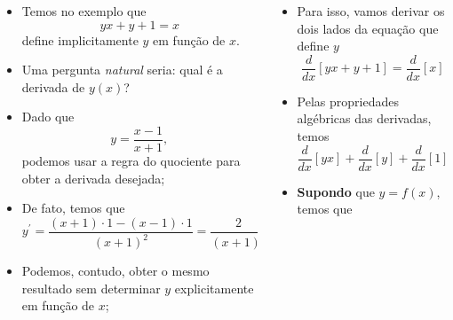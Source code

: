 \begin{frame}
  \begin{columns}[onlytextwidth]
    \begin{column}{0.49\textwidth}\vspace*{-0.5cm}
      \begin{itemize}
        \item Temos no exemplo que
        \begin{equation*}
          yx + y + 1 = x
        \end{equation*}
        define implicitamente $y$ em função de $x$.
        \item Uma pergunta \emph{natural} seria: qual é a derivada de $y(x)$?
        \item Dado que
        \begin{equation*}
          y = \frac{x-1}{x+1},
        \end{equation*}
        podemos usar a regra do quociente para obter a derivada desejada;
        \item De fato, temos que
        \begin{equation*}
          y^{\prime} = \frac{(x+1)\cdot 1 - (x-1)\cdot 1}{(x+1)^{2}} = \frac{2}{(x+1)^{2}}
        \end{equation*}
        \item Podemos, contudo, obter o mesmo resultado sem determinar $y$ explicitamente em função de $x$;
      \end{itemize}
    \end{column}
    \begin{column}{0.49\textwidth}\vspace*{-0.5cm}
      \begin{itemize}
        \item Para isso, vamos derivar os dois lados da equação que define $y$
        \begin{equation*}
          \frac{d}{dx}\left[yx + y + 1\right] = \frac{d}{dx}\left[x\right]
        \end{equation*}
        \item Pelas propriedades algébricas das derivadas, temos
        \begin{equation*}
          \frac{d}{dx}\left[yx\right] + \frac{d}{dx}\left[y\right] + \frac{d}{dx}\left[1\right] = \frac{d}{dx}\left[x\right]
        \end{equation*}
        \item \textbf{Supondo} que $y=f(x)$, temos que
        \begin{equation*}

\end{equation*}
\end{itemize}
\end{column}
\end{columns}
\end{frame}
